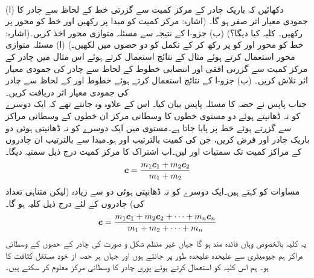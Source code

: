\\
(ا) دکھائیں کہ باریک چادر کے مرکز کمیت سے گزرتی خط کے لحاظ سے  چادر کا جمودی معیار اثر صفر ہو گا۔ (اشارہ: مرکز کمیت کو مبدا پر رکھیں اور  خط کو محور  پر رکھیں۔ کلیہ  کیا دیگا؟) (ب)  جزو-ا کے نتیجہ سے مسئلہ متوازی محور  اخذ کریں۔(اشارہ:  خط  کو محور  اور  کو  پر رکھ کر  کے تکمل کو دو حصوں میں  لکھیں۔)
(ا) مسئلہ متوازی محور استعمال کرتے ہوئے مثال  کے نتائج استعمال کرتے ہوئے  اس مثال میں چادر کے مرکز کمیت سے گزرتی افقی اور انتصابی خطوط کے لحاظ سے چادر کی جمودی معیار اثر تلاش کریں۔ (ب) جزو-ا کے نتائج استعمال کرتے ہوئے خطوط  اور  کے لحاظ سے چادر کی جمودی معیار اثر دریافت کریں۔
\\
جناب پاپس نے حصہ   کا مسئلہ پاپس بیان کیا۔ اس کے علاوہ وہ جانتے تھے کہ  ایک دوسرے کو نہ ڈھانپتے ہوئے دو  مستوی خطوں  کا وسطانی مرکز ان خطوں کے وسطانی مراکز سے گزرتے ہوئے خط پر پایا جاتا ہے۔مستوی  میں ایک دوسرے کو نہ ڈھانپتی ہوئی   دو باریک چادر   اور  فرض کریں،  جن کی کمیت بالترتیب  اور  ہو۔مبدا سے بالترتیب  ان چادروں کے مراکز کمیت تک سمتیات     اور  لیں۔اب اشتراک  کا مرکز کمیت درج ذیل سمتیہ دیگا۔
\begin{align}\label{مساوات_بالکثرت_کلیہ_پاپس}
{\ensuremath{{\boldsymbol{c}}}}=\frac{m_1{{\boldsymbol{c}}}_1+m_2{{\boldsymbol{c}}}_2}{m_1+m_2}
\end{align}
مساوات  کو  کہتے ہیں۔ایک دوسرے کو نہ ڈھانپتی ہوئی دو سے زیادہ (لیکن متناہی تعداد کی)  چادروں کے لئے درج ذیل کلیہ ہو گا۔
\begin{align}\label{مساوات_بالکثرت_عمومی_کلیہ_پاپس}
{\ensuremath{{\boldsymbol{c}}}}=\frac{m_1{{\boldsymbol{c}}}_1+m_2{{\boldsymbol{c}}}_2+\cdots+m_n{{\boldsymbol{c}}}_n}{m_1+m_2+\cdots+m_n}
\end{align}
یہ کلیہ بالخصوص وہاں فائدہ مند ہو گا جہاں   غیر منظم  شکل و صورت کی چادر کے حصوں کے وسطانی مراکز ہم  جیومیٹری سے علیحدہ علیحدہ طور پر جانتے ہوں اور جہاں  ہر حصہ از خود  مستقل کثافت کا ہو۔ ہم اس کلیہ کو استعمال کرتے ہوئے پوری چادر کا وسطانی مرکز معلوم کر سکتے ہیں۔ 

